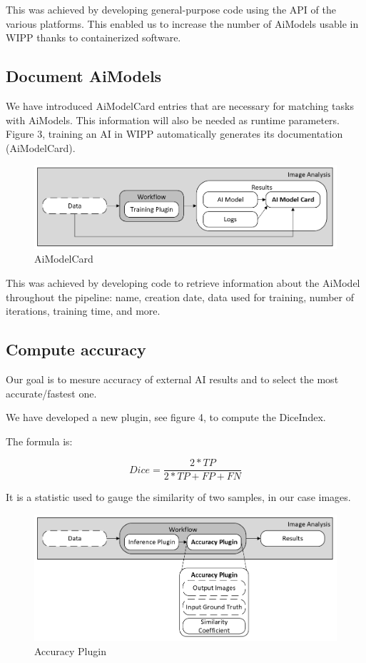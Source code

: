 This was achieved by developing general-purpose code using the \Gls{API} of
the various platforms. This
enabled us to increase the number of \Gls{AiModel}s usable
in \Gls{WIPP} thanks to containerized software.

\subsection{Document \Gls{AiModel}s}

We have introduced \Gls{AiModelCard} entries that are necessary for matching tasks
with \Gls{AiModel}s. This information will also be needed as runtime parameters.
Figure 3, training an \Gls{AI} in \Gls{WIPP} automatically generates its documentation
(\Gls{AiModelCard}).

\begin{figure}[H]
  \centering
  \includegraphics[width=1.0\linewidth]{png/3_ai_model_card.png}
  \caption{\Gls{AiModelCard}}
  \label{fig:3aimodelcard}
\end{figure}

This was achieved by developing code to retrieve information about the \Gls{AiModel}
throughout the pipeline: name, creation date, data used for training, number of
iterations, training time, and more.

\subsection{Compute accuracy}

Our goal is to mesure accuracy of external AI results and to select the most
accurate/fastest one.

We have developed a new plugin, see figure 4, to compute the \Gls{DiceIndex}.

The formula is:

\[ Dice = \frac{2*TP}{2*TP + FP + FN} \]

It is a statistic used to gauge the similarity of two samples, in
our case images.

\begin{figure}[H]
  \centering
  \includegraphics[width=1.0\linewidth]{png/4_accuracy.png}
  \caption{Accuracy Plugin}
  \label{fig:4accuracy}
\end{figure}

